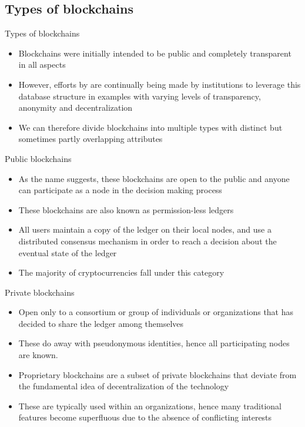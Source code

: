\documentclass[9pt]{beamer}
\begin{document}

\subsection{Types of blockchains}

\begin{frame}{Types of blockchains}
	\begin{itemize}
		\item Blockchains were initially intended to be public and completely transparent in all aspects
		\item However, efforts by are continually being made by institutions to leverage this database structure in examples with varying levels of transparency, anonymity and decentralization
		\item We can therefore divide blockchains into multiple types with distinct but sometimes partly overlapping attributes
	\end{itemize}
\end{frame}


\begin{frame}{Public blockchains}
	\begin{itemize}
		\item As the name suggests, these blockchains are open to the public and anyone can participate as a node in the decision making process
		\item These blockchains are also known as permission-less ledgers
		\item All users maintain a copy of the ledger on their local nodes, and use a distributed consensus mechanism in order to reach a decision about the eventual state of the ledger
		\item The majority of cryptocurrencies fall under this category
	\end{itemize}
\end{frame}


\begin{frame}{Private blockchains}
	\begin{itemize}
		\item Open only to a consortium or group of individuals or organizations that has decided to share the ledger among themselves
		\item These do away with pseudonymous identities, hence all participating nodes are known.
		\item Proprietary blockchains are a subset of private blockchains that deviate from the fundamental idea of decentralization of the technology
		\item These are typically used within an organizations, hence many traditional features become superfluous due to the absence of conflicting interests
	\end{itemize}
\end{frame}
\end{document}
